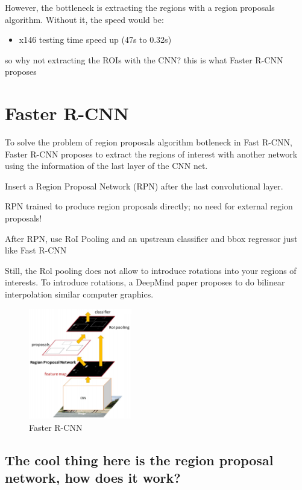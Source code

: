 However, the bottleneck is extracting the regions with a region proposals algorithm. Without it, the speed would be:
\begin{itemize}
\item x146 testing time speed up (47s to 0.32s)
\end{itemize}

so why not extracting the ROIs with the CNN? this is what Faster R-CNN proposes

\section{Faster R-CNN}

To solve the problem of region proposals algorithm botleneck in Fast R-CNN, Faster R-CNN proposes to extract the regions of interest with another network using the information of the last layer of the CNN net.

Insert a Region Proposal Network (RPN) after the last convolutional layer.

RPN trained to produce region proposals directly; no need for
external region proposals!

After RPN, use RoI Pooling and an upstream classifier and bbox regressor just like Fast R-CNN

Still, the Rol pooling does not allow to introduce rotations into your regions of interests. To introduce rotations, a DeepMind paper proposes to do bilinear interpolation similar computer graphics.

\begin{figure}[h]
  \centering
  \includegraphics[width=0.4\textwidth]{Images/region_based_cnn/14.png}
  \caption{Faster R-CNN}
\end{figure}

\subsection*{The cool thing here is the region proposal network, how does it work?}

